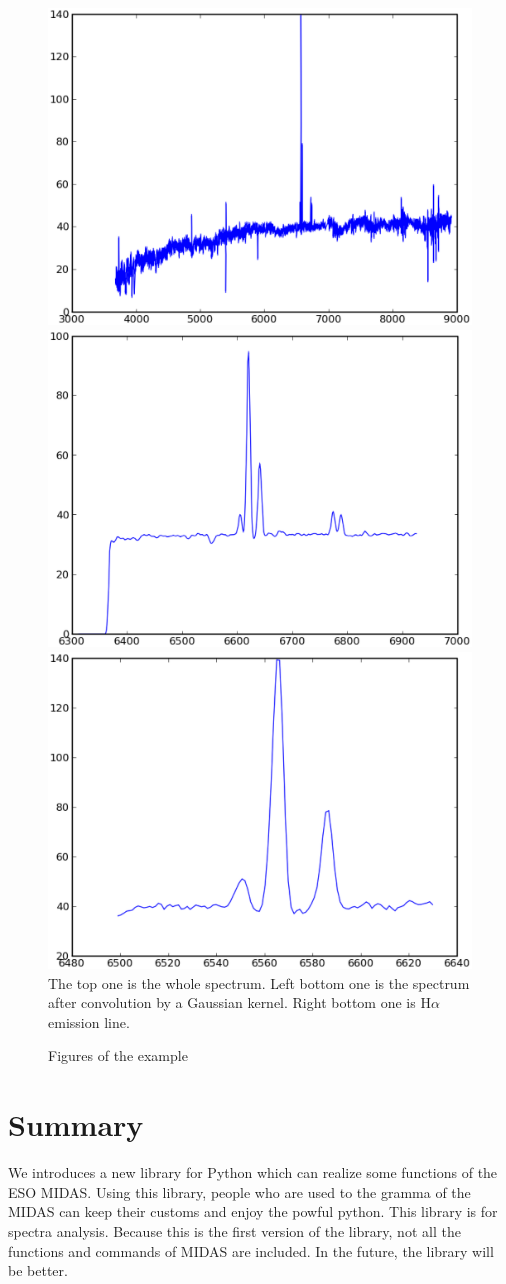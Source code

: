 \begin{figure}[!hb]
\begin{center}
\caption{Figures of the example}
\label{fig}
\includegraphics[width=1.\textwidth, height=.2\textheight]{part9/Song_P65/spectra}\\

\includegraphics[width=.46\textwidth]{part9/Song_P65/part}
\includegraphics[width=.46\textwidth]{part9/Song_P65/halpha}\\
The top one is the whole spectrum. Left bottom one is the spectrum after convolution by a Gaussian kernel. Right bottom one is 
H$\alpha$ emission line.
\end{center}
\end{figure}
	  \section{Summary}
We introduces a new library for Python which can realize some functions of 
the ESO MIDAS. Using this library, people who are used to the gramma of the MIDAS
can keep their customs and enjoy the powful python. This library is for spectra
analysis. Because this is the first version of the library, not all the functions 
and commands of MIDAS are included. In the future, the library will be better.
